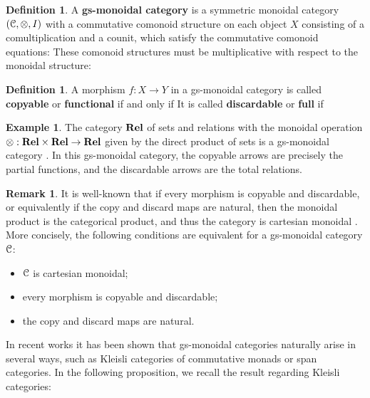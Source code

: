 \documentclass[a4paper,UKenglish,numberwithinsect,cleveref, autoref, thm-restate]{lipics-v2021}
\theoremstyle{plain} %
\theoremstyle{definition} %
\newtheorem{mydefinition}[mytheorem]{Definition}
\newtheorem{myremark}[mytheorem]{Remark}
\newtheorem{myexample}[mytheorem]{Example}
\begin{document}
\begin{mydefinition}
A \textbf{gs-monoidal category} is a symmetric monoidal category $(\mathcal{C}, \otimes, I)$
with a commutative comonoid structure on each object $X$ consisting of a comultiplication
and a counit,
which satisfy the commutative comonoid equations:
These comonoid structures must be multiplicative with respect to the monoidal structure:

\end{mydefinition}


\begin{mydefinition}
 A morphism $f:X\to Y$ in a gs-monoidal category is called \textbf{copyable} or \textbf{functional} if and only if
 It is called \textbf{discardable} or \textbf{full} if 
\end{mydefinition}

\begin{myexample}
The category $\mathbf{Rel}$ of sets and relations with the monoidal operation $\otimes : \mathbf{Rel} \times \mathbf{Rel}\to \mathbf{Rel}$ given by the direct product of sets is a gs-monoidal category \cite{CorradiniGadducci02}. In this gs-monoidal category, the copyable arrows are precisely the partial functions, and the discardable arrows are the total relations.
\end{myexample}

\begin{myremark}
It is well-known that if every morphism is copyable and discardable, or equivalently if the copy and discard maps are natural, then the monoidal product is the categorical product, and thus the category is cartesian monoidal \cite{Fox:CACC}.
More concisely, the following conditions are equivalent for a gs-monoidal category $\mathcal{C}$:
 \begin{itemize}
  \item $\mathcal{C}$ is cartesian monoidal;
  \item every morphism is copyable and discardable;
  \item the copy and discard maps are natural.
 \end{itemize}
\end{myremark}

In recent works \cite{tba}
it has been shown that gs-monoidal categories naturally arise in several ways, such as Kleisli categories of commutative monads or span categories. In the following proposition, we recall the result regarding Kleisli categories:
\end{document}
